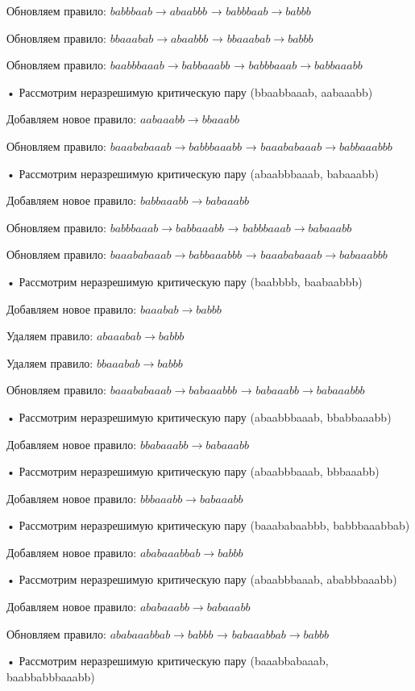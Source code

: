 \documentclass[a4paper, 14pt]{extarticle}
\begin{document}
    Обновляем правило: $babbbaab \to abaabbb$ → $babbbaab \to babbb$

    Обновляем правило: $bbaaabab \to abaabbb$ → $bbaaabab \to babbb$

    Обновляем правило: $baabbbaaab \to babbaaabb$ → $babbbaaab \to babbaaabb$

   • Рассмотрим неразрешимую критическую пару (bbaabbaaab, aabaaabb)

        Добавляем новое правило: $aabaaabb \to bbaaabb$

    Обновляем правило: $baaababaaab \to babbbaaabb$ → $baaababaaab \to babbaaabbb$

   • Рассмотрим неразрешимую критическую пару (abaabbbaaab, babaaabb)

        Добавляем новое правило: $babbaaabb \to babaaabb$

    Обновляем правило: $babbbaaab \to babbaaabb$ → $babbbaaab \to babaaabb$

    Обновляем правило: $baaababaaab \to babbaaabbb$ → $baaababaaab \to babaaabbb$

   • Рассмотрим неразрешимую критическую пару (baabbbb, baabaabbb)

        Добавляем новое правило: $baaabab \to babbb$

    Удаляем правило: $abaaabab \to babbb$

    Удаляем правило: $bbaaabab \to babbb$

    Обновляем правило: $baaababaaab \to babaaabbb$ → $babaaabb \to babaaabbb$

   • Рассмотрим неразрешимую критическую пару (abaabbbaaab, bbabbaaabb)

        Добавляем новое правило: $bbabaaabb \to babaaabb$

   • Рассмотрим неразрешимую критическую пару (abaabbbaaab, bbbaaabb)

        Добавляем новое правило: $bbbaaabb \to babaaabb$

   • Рассмотрим неразрешимую критическую пару (baaababaabbb, babbbaaabbab)

        Добавляем новое правило: $ababaaabbab \to babbb$

   • Рассмотрим неразрешимую критическую пару (abaabbbaaab, ababbbaaabb)

        Добавляем новое правило: $ababaaabb \to babaaabb$

    Обновляем правило: $ababaaabbab \to babbb$ → $babaaabbab \to babbb$

   • Рассмотрим неразрешимую критическую пару (baaabbabaaab, baabbabbbaaabb)
\end{document}
